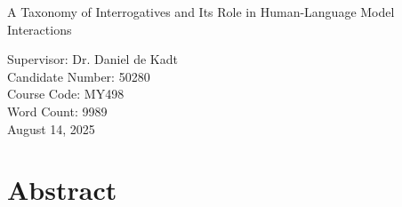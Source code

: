 \documentclass[
  12pt,
]{article}
\author{}
\date{\vspace{-2.5em}}
\begin{document}
\vspace{1.5em}

\begin{center}
{\normalfont\LARGE
\begin{spacing}{1.5}
\begin{minipage}{0.85\textwidth}\centering
A Taxonomy of Interrogatives and Its Role in Human-Language Model Interactions
\end{minipage}
\end{spacing}
}

\vspace{3em} %

Supervisor: Dr. Daniel de Kadt\\
Candidate Number: 50280\\
Course Code: MY498\\
Word Count: 9989\\
August 14, 2025
\end{center}

\clearpage

\section{Abstract}\label{abstract}
\end{document}
